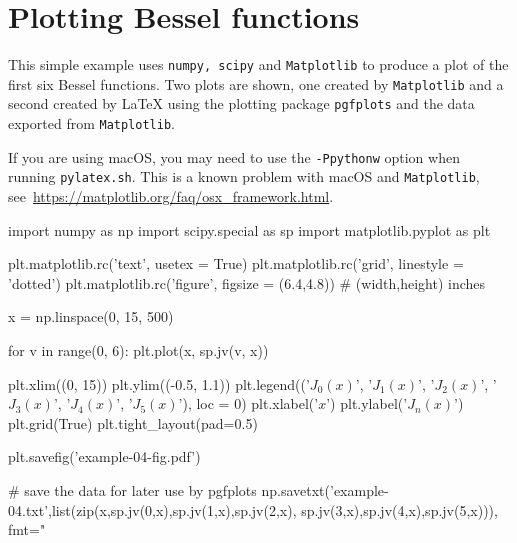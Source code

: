 \documentclass[12pt]{pylatex}
\begin{document}
\section*{Plotting Bessel functions}

\vspace{-5pt}

This simple example uses {\tt\small numpy, scipy} and {\tt\small Matplotlib} to produce a plot
of the first six Bessel functions. Two plots are shown, one created by {\tt\small Matplotlib}
and a second created by LaTeX using the plotting package {\tt\small pgfplots} and the data
exported from {\tt\small Matplotlib}.

If you are using macOS, you may need to use the {\tt\small -Ppythonw} option when running
{\tt\small pylatex.sh}. This is a known problem with macOS and {\tt\small Matplotlib}, see\
\url{https://matplotlib.org/faq/osx_framework.html}.

\vspace{-10pt}

\begin{minipage}[t]{0.60\textwidth}
\begin{python}
   import numpy as np
   import scipy.special as sp
   import matplotlib.pyplot as plt

   plt.matplotlib.rc('text', usetex = True)
   plt.matplotlib.rc('grid', linestyle = 'dotted')
   plt.matplotlib.rc('figure', figsize = (6.4,4.8)) # (width,height) inches

   x = np.linspace(0, 15, 500)

   for v in range(0, 6):
       plt.plot(x, sp.jv(v, x))

   plt.xlim((0, 15))
   plt.ylim((-0.5, 1.1))
   plt.legend(('${J}_0(x)$', '${J}_1(x)$', '${J}_2(x)$',
               '${J}_3(x)$', '${J}_4(x)$', '${J}_5(x)$'), loc = 0)
   plt.xlabel('$x$')
   plt.ylabel('${J}_n(x)$')
   plt.grid(True)
   plt.tight_layout(pad=0.5)

   plt.savefig('example-04-fig.pdf')

   # save the data for later use by pgfplots
   np.savetxt('example-04.txt',list(zip(x,sp.jv(0,x),sp.jv(1,x),sp.jv(2,x),
                                          sp.jv(3,x),sp.jv(4,x),sp.jv(5,x))),
                               fmt="%
\end{python}
\end{minipage}

\clearpage
\end{document}
